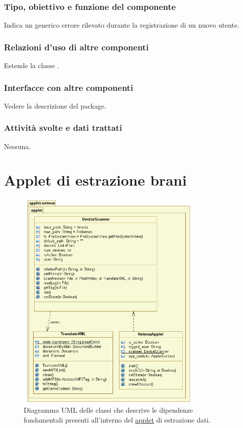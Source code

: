 \subsubsection*{Tipo, obiettivo e funzione del componente}
Indica un generico errore rilevato durante la registrazione di un nuovo utente.
\subsubsection*{Relazioni d'uso di altre componenti}
Estende la classe .
\subsubsection*{Interfacce con altre componenti}
Vedere la descrizione del package.
\subsubsection*{Attivit\`a svolte e dati trattati}
Nessuna.


\newpage
\section{Applet di estrazione brani}

\begin{figure}[!h]
  \centering
  \includegraphics[width=9cm]{img/DP/applet.png}
\caption{Diagramma UML delle classi che descrive le dipendenze
fondamentali presenti all'interno del \underline{applet} di estrazione dati.}
\end{figure}

